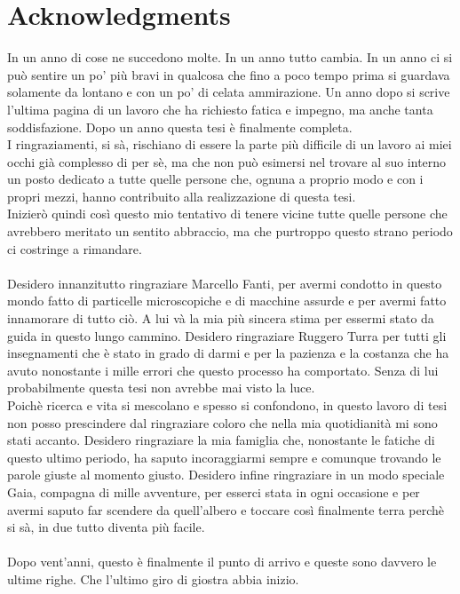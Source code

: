 \chapter*{Acknowledgments}
In un anno di cose ne succedono molte. In un anno tutto cambia. In un anno ci si può sentire un po' più bravi in qualcosa che fino a poco tempo prima si guardava solamente da lontano e con un po' di celata ammirazione. Un anno dopo si scrive l'ultima pagina di un lavoro che ha richiesto fatica e impegno, ma anche tanta soddisfazione. Dopo un anno questa tesi è finalmente completa.
\\
I ringraziamenti, si sà, rischiano di essere la parte più difficile di un lavoro ai miei occhi già complesso di per sè, ma che non può esimersi nel trovare al suo interno un posto dedicato a tutte quelle persone che, ognuna a proprio modo e con i propri mezzi, hanno contribuito alla realizzazione di questa tesi.
\\
Inizierò quindi così questo mio tentativo di tenere vicine tutte quelle persone che avrebbero meritato un sentito abbraccio, ma che purtroppo questo strano periodo ci costringe a rimandare.
\\\\
Desidero innanzitutto ringraziare Marcello Fanti, per avermi condotto in questo mondo fatto di particelle microscopiche e di macchine assurde e per avermi fatto innamorare di tutto ciò. A lui và la mia più sincera stima per essermi stato da guida in questo lungo cammino. Desidero ringraziare Ruggero Turra per tutti gli insegnamenti che è stato in grado di darmi e per la pazienza e la costanza che ha avuto nonostante i mille errori che questo processo ha comportato. Senza di lui probabilmente questa tesi non avrebbe mai visto la luce.
\\
Poichè ricerca e vita si mescolano e spesso si confondono, in questo lavoro di tesi non posso prescindere dal ringraziare coloro che nella mia quotidianità mi sono stati accanto. Desidero ringraziare la mia famiglia che, nonostante le fatiche di questo ultimo periodo, ha saputo incoraggiarmi sempre e comunque trovando le parole giuste al momento giusto. Desidero infine ringraziare in un modo speciale Gaia, compagna di mille avventure, per esserci stata in ogni occasione e per avermi saputo far scendere da quell'albero e toccare così finalmente terra perchè si sà, in due tutto diventa più facile. 
\\\\
Dopo vent'anni, questo è finalmente il punto di arrivo e queste sono davvero le ultime righe. Che l'ultimo giro di giostra abbia inizio.